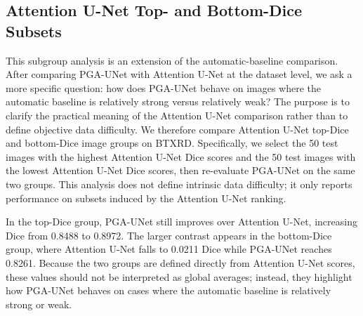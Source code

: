 \documentclass{ieeeaccess}
\begin{document}
\subsection{Attention U-Net Top- and Bottom-Dice Subsets}
This subgroup analysis is an extension of the automatic-baseline comparison. After comparing PGA-UNet with Attention U-Net at the dataset level, we ask a more specific question: how does PGA-UNet behave on images where the automatic baseline is relatively strong versus relatively weak? The purpose is to clarify the practical meaning of the Attention U-Net comparison rather than to define objective data difficulty. We therefore compare Attention U-Net top-Dice and bottom-Dice image groups on BTXRD. Specifically, we select the 50 test images with the highest Attention U-Net Dice scores and the 50 test images with the lowest Attention U-Net Dice scores, then re-evaluate PGA-UNet on the same two groups. This analysis does not define intrinsic data difficulty; it only reports performance on subsets induced by the Attention U-Net ranking.

\begin{table}
\caption{Top-Dice and bottom-Dice comparison on BTXRD (50 images per group).}
\label{tab:extreme}
\centering
{}
\end{table}

In the top-Dice group, PGA-UNet still improves over Attention U-Net, increasing Dice from 0.8488 to 0.8972. The larger contrast appears in the bottom-Dice group, where Attention U-Net falls to 0.0211 Dice while PGA-UNet reaches 0.8261. Because the two groups are defined directly from Attention U-Net scores, these values should not be interpreted as global averages; instead, they highlight how PGA-UNet behaves on cases where the automatic baseline is relatively strong or weak.
\end{document}
